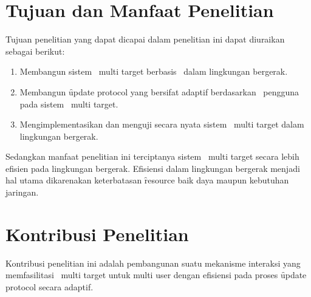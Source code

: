 \section{Tujuan dan Manfaat Penelitian}

Tujuan penelitian yang dapat dicapai dalam penelitian ini dapat diuraikan sebagai
berikut:
\begin{enumerate}
  \item Membangun sistem \tracking~multi target berbasis \pubsub~dalam lingkungan
    bergerak.
  \item Membangun \f{update protocol} yang bersifat adaptif berdasarkan
    \context~pengguna pada sistem \tracking~multi target.
  \item Mengimplementasikan dan menguji secara nyata sistem \tracking~multi
    target dalam lingkungan bergerak.
\end{enumerate}

Sedangkan manfaat penelitian ini terciptanya sistem \tracking~multi target
secara lebih efisien pada lingkungan bergerak. Efisiensi dalam lingkungan
bergerak menjadi hal utama dikarenakan keterbatasan \f{resource} baik daya
maupun kebutuhan jaringan.


\section{Kontribusi Penelitian}

Kontribusi penelitian ini adalah pembangunan suatu mekanisme interaksi yang
memfasilitasi \tracking~multi target untuk multi user dengan efisiensi pada
proses \f{update protocol} secara adaptif.

